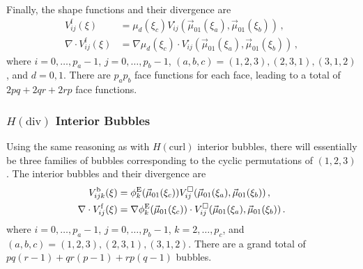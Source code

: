 Finally, the shape functions and their divergence are
\begin{equation}
	\begin{aligned}
		V_{ij}^\mathrm{f}(\xi)&=\mu_d(\xi_c)V_{ij}^{\square}(\vec{\mu}_{01}(\xi_a),\vec{\mu}_{01}(\xi_b))\,,\\
		\nabla\cdot V_{ij}^\mathrm{f}(\xi)&=\nabla\mu_d(\xi_c)\cdot V_{ij}^{\square}(\vec{\mu}_{01}(\xi_a),\vec{\mu}_{01}(\xi_b))\,,
	\end{aligned}	
\end{equation}
where $i=0,\ldots,p_a-1$, $j=0,\ldots,p_b-1$, $(a,b,c)=(1,2,3),(2,3,1),(3,1,2)$, and $d=0,1$.
There are $p_ap_b$ face functions for each face, leading to a total of $2pq+2qr+2rp$ face functions.

\subsubsection{\texorpdfstring{$H(\mathrm{div})$}{Hdiv} Interior Bubbles}
Using the same reasoning as with $H(\mathrm{curl})$ interior bubbles, there will essentially be three families of bubbles corresponding to the cyclic permutations of $(1,2,3)$.
The interior bubbles and their divergence are
\begin{equation}
	\begin{aligned}
		V_{ijk}^\mathrm{b}(\xi)&=\phi_k^{\mathrm{E}}(\vec{\mu}_{01}(\xi_c))V_{ij}^\square(\vec{\mu}_{01}(\xi_a),\vec{\mu}_{01}(\xi_b))\,,\\
		\nabla\cdot V_{ij}^\mathrm{f}(\xi)&=
			\nabla\phi_k^{\mathrm{E}}(\vec{\mu}_{01}(\xi_c))\cdot V_{ij}^\square(\vec{\mu}_{01}(\xi_a),\vec{\mu}_{01}(\xi_b))\,.
	\end{aligned}
\end{equation}
where $i=0,\ldots,p_a-1$, $j=0,\ldots,p_b-1$, $k=2,\ldots,p_c$, and $(a,b,c)=(1,2,3),(2,3,1),(3,1,2)$.
There are a grand total of $pq(r-1)+qr(p-1)+rp(q-1)$ bubbles.

